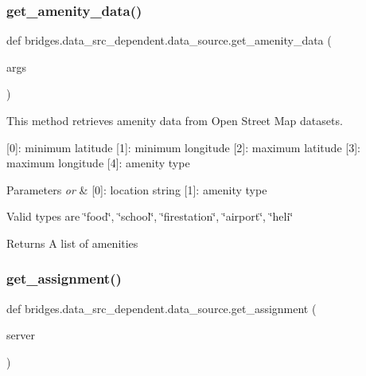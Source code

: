 \subsubsection{\texorpdfstring{get\+\_\+amenity\+\_\+data()}{get\_amenity\_data()}}
{\footnotesize\ttfamily def bridges.\+data\+\_\+src\+\_\+dependent.\+data\+\_\+source.\+get\+\_\+amenity\+\_\+data (\begin{DoxyParamCaption}\item[{}]{args }\end{DoxyParamCaption})}



This method retrieves amenity data from Open Street Map datasets. 

\mbox{[}0\mbox{]}\+: minimum latitude \mbox{[}1\mbox{]}\+: minimum longitude \mbox{[}2\mbox{]}\+: maximum latitude \mbox{[}3\mbox{]}\+: maximum longitude \mbox{[}4\mbox{]}\+: amenity type 
\begin{DoxyParams}{Parameters}
{\em or} & \mbox{[}0\mbox{]}\+: location string \mbox{[}1\mbox{]}\+: amenity type\\
\hline
\end{DoxyParams}
Valid types are \char`\"{}food\char`\"{}, \char`\"{}school\char`\"{}, \char`\"{}firestation\char`\"{}, \char`\"{}airport\char`\"{}, \char`\"{}heli\char`\"{}

\begin{DoxyReturn}{Returns}
A list of amenities 
\end{DoxyReturn}
\mbox{\label{namespacebridges_1_1data__src__dependent_1_1data__source_add1ea37030fe616297d99cfdf4ae890d}} 
\subsubsection{\texorpdfstring{get\+\_\+assignment()}{get\_assignment()}}
{\footnotesize\ttfamily def bridges.\+data\+\_\+src\+\_\+dependent.\+data\+\_\+source.\+get\+\_\+assignment (\begin{DoxyParamCaption}\item[{}]{server }\end{DoxyParamCaption})}



